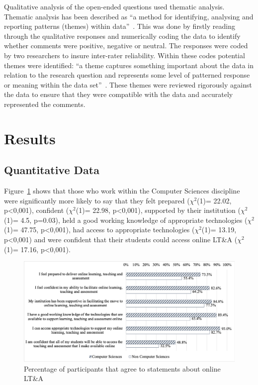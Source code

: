 \documentclass[sigconf]{acmart}
\begin{document}
Qualitative analysis of the open-ended questions used thematic
analysis. Thematic analysis has been described as ``a method for
identifying, analysing and reporting patterns (themes) within
data''~\cite[p.78]{braun+clarke:2006}. This was done by firstly reading
through the qualitative responses and numerically coding the data to
identify whether comments were positive, negative or neutral. The
responses were coded by two researchers to insure inter-rater
reliability. Within these codes potential themes were identified: ``a
theme captures something important about the data in relation to the
research question and represents some level of patterned response or
meaning within the data set''~\cite[p.82]{braun+clarke:2006}. These
themes were reviewed rigorously against the data to ensure that they
were compatible with the data and accurately represented the comments. 

\section{Results}\label{results}

\subsection{Quantitative Data}\label{quantdata}

Figure~\ref{fig:partagree} shows that those who work within the
Computer Sciences discipline were significantly more likely to say
that they felt prepared ($\chi^2$(1)= 22.02, p<0,001), confident
($\chi^2$(1)= 22.98, p<0,001), supported by their institution
($\chi^2$(1)= 4.5, p=0.03), held a good working knowledge of
appropriate technologies ($\chi^2$(1)= 47.75, p<0,001), had access to
appropriate technologies ($\chi^2$(1)= 13.19, p<0,001) and were
confident that their students could access online LT\&A ($\chi^2$(1)=
17.16, p<0,001).

\begin{figure}
\includegraphics[width=\textwidth]{images/particagree.png}
\caption{Percentage of participants that agree to statements about
  online LT\&A}
\label{fig:partagree}
\end{figure}
\end{document}
